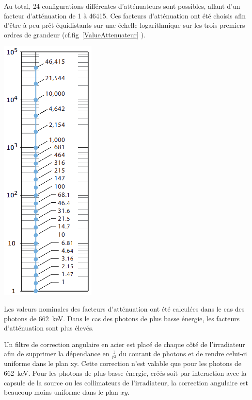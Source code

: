 Au total, 24 configurations différentes d'atténuateurs sont possibles, allant d'un facteur d'atténuation de 1 à 46415. Ces facteurs d'atténuation ont été choisis afin d'être à peu prêt équidistants sur une échelle logarithmique sur les trois premiers ordres de grandeur (cf.fig~\ref{ValueAttenuateur} \cite{Pfeiffer:2016hnl}).

\marginpar
{
	\centering
	\includegraphics[width=1.0\marginparwidth]{GLA/ValueAttenuateur.png}
	\label{ValueAttenuateur}
}

Les valeurs nominales des facteurs d'atténuation ont été calculées dans le cas des photons de \SI{662}{\kilo\eV}. Dans le cas des photons de plus basse énergie, les facteurs d'atténuation sont plus élevés. 

Un filtre de correction angulaire en acier est placé de chaque côté de l'irradiateur afin de supprimer la dépendance en $\frac{1}{r^2}$ du courant de photons et de rendre celui-ci uniforme dans le plan xy. Cette correction n'est valable que pour les photons de \SI{662}{\kilo\eV}. Pour les photons de plus basse énergie, créés soit par interaction avec la capsule de la source ou les collimateurs de l'irradiateur, la correction angulaire est beaucoup moins uniforme dans le plan $xy$.

